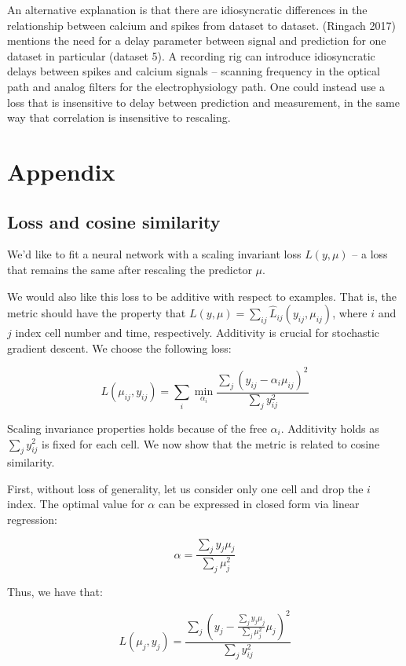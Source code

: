 \documentclass[]{article}
\begin{document}
An alternative explanation is that there are idiosyncratic differences
in the relationship between calcium and spikes from dataset to dataset.
(Ringach 2017) mentions the need for a delay parameter between signal
and prediction for one dataset in particular (dataset 5). A recording
rig can introduce idiosyncratic delays between spikes and calcium
signals -- scanning frequency in the optical path and analog filters for
the electrophysiology path. One could instead use a loss that is
insensitive to delay between prediction and measurement, in the same way
that correlation is insensitive to rescaling.

\section{Appendix}\label{appendix}

\subsection{Loss and cosine
similarity}\label{loss-and-cosine-similarity}

We'd like to fit a neural network with a scaling invariant loss
\(L(y, \mu)\) -- a loss that remains the same after rescaling the
predictor \(\mu\).

We would also like this loss to be additive with respect to examples.
That is, the metric should have the property that
\(L(y, \mu) = \sum_{ij} \hat L_{ij}(y_{ij}, \mu_{ij})\), where \(i\) and
\(j\) index cell number and time, respectively. Additivity is crucial
for stochastic gradient descent. We choose the following loss:

\[
L(\mu_{ij}, y_{ij}) = \sum_i \min_{\alpha_i} \frac{\sum_j (y_{ij} - \alpha_i \mu_{ij})^2}{\sum_{j} y_{ij}^2}
\]

Scaling invariance properties holds because of the free \(\alpha_i\).
Additivity holds as \(\sum_{j} y_{ij}^2\) is fixed for each cell. We now
show that the metric is related to cosine similarity.

First, without loss of generality, let us consider only one cell and
drop the \(i\) index. The optimal value for \(\alpha\) can be expressed
in closed form via linear regression:

\[\alpha = \frac{\sum_j y_j \mu_j}{\sum_j \mu_j^2}\]

Thus, we have that:

\[
L(\mu_{j}, y_{j}) = \frac{\sum_j (y_{j} - \frac{\sum_j y_j \mu_j}{\sum_j \mu_j^2} \mu_{j})^2}{\sum_{j} y_{ij}^2}
\]
\end{document}
